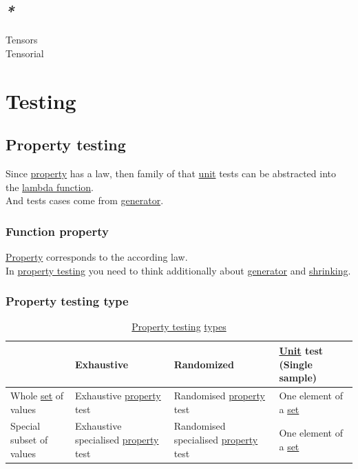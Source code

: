 \documentclass[a4paper,14pt,oneside]{book}
\begin{document}
\section{\emph{*}}
\label{sec:orge05ad62}

\label{org36b352c}Tensors\\
\label{orga8bc55c}Tensorial\\

\chapter{\label{org8b90beb}Testing}
\label{sec:orgb3c9bf1}
\section{\label{orgc0e85fc}Property testing}
\label{sec:org91a203e}
Since \hyperref[org217f324]{property} has a law, then family of that \hyperref[org86a0a0a]{unit} tests can be abstracted into the \hyperref[orgb9f8cf4]{lambda function}.\\
And tests cases come from \hyperref[orgc2df65b]{generator}.\\

\subsection{\label{org58e29b5}Function property}
\label{sec:orgd1a0192}
\hyperref[org217f324]{Property} corresponds to the according law.\\
In \hyperref[orgc0e85fc]{property testing} you need to think additionally about \hyperref[orgc2df65b]{generator} and \hyperref[orge81de6c]{shrinking}.\\

\subsection{\label{orgb7171a1}Property testing type}
\label{sec:org278505f}

\begin{table}[htbp]
\caption{\label{tab--property-testing-type}\hyperref[orgc0e85fc]{Property testing} \hyperref[org430d788]{types}}
\centering
\begin{tabular}{llll}
\hline
 & Exhaustive & Randomized & \hyperref[org86a0a0a]{Unit} test (Single sample)\\
\hline
Whole \hyperref[org2ca93d9]{set} of values & Exhaustive \hyperref[org217f324]{property} test & Randomised \hyperref[org217f324]{property} test & One element of a \hyperref[org2ca93d9]{set}\\
Special subset of values & Exhaustive specialised \hyperref[org217f324]{property} test & Randomised specialised \hyperref[org217f324]{property} test & One element of a \hyperref[org2ca93d9]{set}\\
\hline
\end{tabular}
\end{table}
\end{document}
